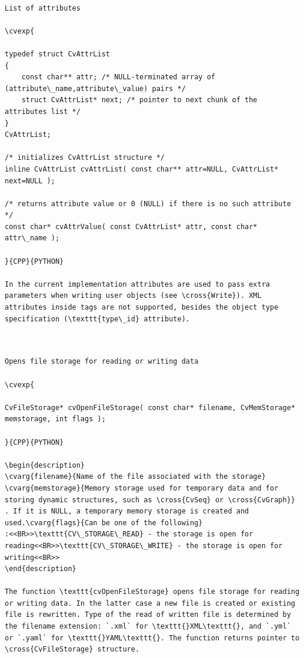 \label{CvAttrList}
\begin{verbatim}

List of attributes

\cvexp{

typedef struct CvAttrList
{
    const char** attr; /* NULL-terminated array of (attribute\_name,attribute\_value) pairs */
    struct CvAttrList* next; /* pointer to next chunk of the attributes list */
}
CvAttrList;

/* initializes CvAttrList structure */
inline CvAttrList cvAttrList( const char** attr=NULL, CvAttrList* next=NULL );

/* returns attribute value or 0 (NULL) if there is no such attribute */
const char* cvAttrValue( const CvAttrList* attr, const char* attr\_name );

}{CPP}{PYTHON}

In the current implementation attributes are used to pass extra parameters when writing user objects (see \cross{Write}). XML attributes inside tags are not supported, besides the object type specification (\texttt{type\_id} attribute).


\end{verbatim}
\label{OpenFileStorage}
\begin{verbatim}

Opens file storage for reading or writing data

\cvexp{

CvFileStorage* cvOpenFileStorage( const char* filename, CvMemStorage* memstorage, int flags );

}{CPP}{PYTHON}

\begin{description}
\cvarg{filename}{Name of the file associated with the storage}
\cvarg{memstorage}{Memory storage used for temporary data and for storing dynamic structures, such as \cross{CvSeq} or \cross{CvGraph}}
. If it is NULL, a temporary memory storage is created and used.\cvarg{flags}{Can be one of the following}
:<<BR>>\texttt{CV\_STORAGE\_READ} - the storage is open for reading<<BR>>\texttt{CV\_STORAGE\_WRITE} - the storage is open for writing<<BR>>
\end{description}

The function \texttt{cvOpenFileStorage} opens file storage for reading or writing data. In the latter case a new file is created or existing file is rewritten. Type of the read of written file is determined by the filename extension: `.xml` for \texttt{}XML\texttt{}, and `.yml` or `.yaml` for \texttt{}YAML\texttt{}. The function returns pointer to \cross{CvFileStorage} structure.


\end{verbatim}
